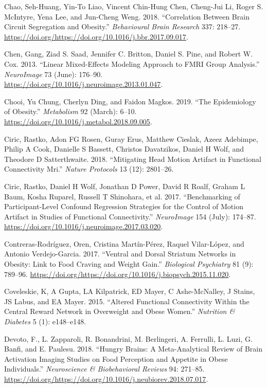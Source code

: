 \documentclass[
]{article}
\begin{document}
\leavevmode\hypertarget{ref-Chao_2018}{}%
Chao, Seh-Huang, Yin-To Liao, Vincent Chin-Hung Chen, Cheng-Jui Li, Roger S. McIntyre, Yena Lee, and Jun-Cheng Weng. 2018. ``Correlation Between Brain Circuit Segregation and Obesity.'' \emph{Behavioural Brain Research} 337: 218--27. \url{https://doi.org/https://doi.org/10.1016/j.bbr.2017.09.017}.

\leavevmode\hypertarget{ref-Chen_2013}{}%
Chen, Gang, Ziad S. Saad, Jennifer C. Britton, Daniel S. Pine, and Robert W. Cox. 2013. ``Linear Mixed-Effects Modeling Approach to FMRI Group Analysis.'' \emph{NeuroImage} 73 (June): 176--90. \url{https://doi.org/10.1016/j.neuroimage.2013.01.047}.

\leavevmode\hypertarget{ref-Chooi_2019}{}%
Chooi, Yu Chung, Cherlyn Ding, and Faidon Magkos. 2019. ``The Epidemiology of Obesity.'' \emph{Metabolism} 92 (March): 6--10. \url{https://doi.org/10.1016/j.metabol.2018.09.005}.

\leavevmode\hypertarget{ref-Ciric_2018}{}%
Ciric, Rastko, Adon FG Rosen, Guray Erus, Matthew Cieslak, Azeez Adebimpe, Philip A Cook, Danielle S Bassett, Christos Davatzikos, Daniel H Wolf, and Theodore D Satterthwaite. 2018. ``Mitigating Head Motion Artifact in Functional Connectivity Mri.'' \emph{Nature Protocols} 13 (12): 2801--26.

\leavevmode\hypertarget{ref-Ciric_2017}{}%
Ciric, Rastko, Daniel H Wolf, Jonathan D Power, David R Roalf, Graham L Baum, Kosha Ruparel, Russell T Shinohara, et al. 2017. ``Benchmarking of Participant-Level Confound Regression Strategies for the Control of Motion Artifact in Studies of Functional Connectivity.'' \emph{NeuroImage} 154 (July): 174--87. \url{https://doi.org/10.1016/j.neuroimage.2017.03.020}.

\leavevmode\hypertarget{ref-Contreras_2017}{}%
Contreras-Rodríguez, Oren, Cristina Martín-Pérez, Raquel Vilar-López, and Antonio Verdejo-Garcia. 2017. ``Ventral and Dorsal Striatum Networks in Obesity: Link to Food Craving and Weight Gain.'' \emph{Biological Psychiatry} 81 (9): 789--96. \url{https://doi.org/https://doi.org/10.1016/j.biopsych.2015.11.020}.

\leavevmode\hypertarget{ref-Coveleskie_2015}{}%
Coveleskie, K, A Gupta, LA Kilpatrick, ED Mayer, C Ashe-McNalley, J Stains, JS Labus, and EA Mayer. 2015. ``Altered Functional Connectivity Within the Central Reward Network in Overweight and Obese Women.'' \emph{Nutrition \& Diabetes} 5 (1): e148--e148.

\leavevmode\hypertarget{ref-Devoto_2018}{}%
Devoto, F., L. Zapparoli, R. Bonandrini, M. Berlingeri, A. Ferrulli, L. Luzi, G. Banfi, and E. Paulesu. 2018. ``Hungry Brains: A Meta-Analytical Review of Brain Activation Imaging Studies on Food Perception and Appetite in Obese Individuals.'' \emph{Neuroscience \& Biobehavioral Reviews} 94: 271--85. \url{https://doi.org/https://doi.org/10.1016/j.neubiorev.2018.07.017}.
\end{document}
